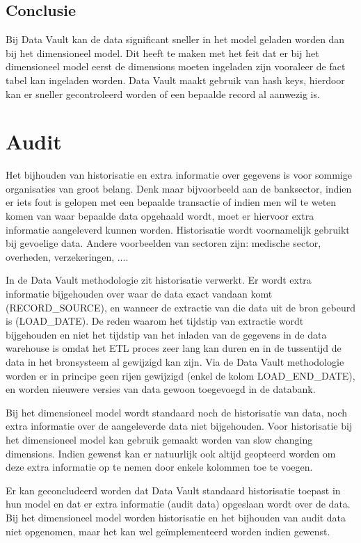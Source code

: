 \subsection{Conclusie} 

Bij Data Vault kan de data significant sneller in het model geladen worden dan bij het dimensioneel model. Dit heeft te maken met het feit dat er bij het dimensioneel model eerst de dimensions moeten ingeladen zijn vooraleer de fact tabel kan ingeladen worden. Data Vault maakt gebruik van hash keys, hierdoor kan er sneller gecontroleerd worden of een bepaalde record al aanwezig is.

\section{Audit}
Het bijhouden van historisatie en extra informatie over gegevens is voor sommige organisaties van groot belang. Denk maar bijvoorbeeld aan de banksector, indien er iets fout is gelopen met een bepaalde transactie of indien men wil te weten komen van waar bepaalde data opgehaald wordt, moet er hiervoor extra informatie aangeleverd kunnen worden. Historisatie wordt voornamelijk gebruikt bij gevoelige data. Andere voorbeelden van sectoren zijn: medische sector, overheden, verzekeringen, ....

In de Data Vault methodologie zit historisatie verwerkt. Er wordt extra informatie bijgehouden over waar de data exact vandaan komt (RECORD\_SOURCE), en wanneer de extractie van die data uit de bron gebeurd is (LOAD\_DATE). De reden waarom het tijdstip van extractie wordt bijgehouden en niet het tijdstip van het inladen van de gegevens in de data warehouse is omdat het ETL proces zeer lang kan duren en in de tussentijd de data in het bronsysteem al gewijzigd kan zijn. Via de Data Vault methodologie worden er in principe geen rijen gewijzigd (enkel de kolom LOAD\_END\_DATE), en worden nieuwere versies van data gewoon toegevoegd in de databank.

Bij het dimensioneel model wordt standaard noch de historisatie van data, noch extra informatie over de aangeleverde data niet bijgehouden. Voor historisatie bij het dimensioneel model kan gebruik gemaakt worden van slow changing dimensions. Indien gewenst kan er natuurlijk ook altijd geopteerd worden om deze extra informatie op te nemen door enkele kolommen toe te voegen. 

Er kan geconcludeerd worden dat Data Vault standaard historisatie toepast in hun model en dat er extra informatie (audit data) opgeslaan wordt over de data. Bij het dimensioneel model worden historisatie en het bijhouden van audit data niet opgenomen, maar het kan wel geïmplementeerd worden indien gewenst.

